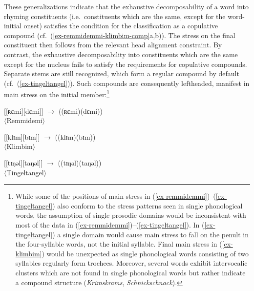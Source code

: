 \documentclass[output=paper
 ,nobabel
 ,draftmode
 ,colorlinks, citecolor=brown
]{langscibook}
\begin{document}
\noindent
These generalizations indicate that the exhaustive decomposability of a word into rhyming constituents (i.e.\ constituents which are the same, except for the word-initial onset) satisfies the condition for the classification as a copulative compound (cf.\ (\ref{ex-remmidemmi-klimbim-comp}a,b)).
The stress on the final constituent then follows from the relevant head alignment constraint. By contrast, the exhaustive decomposability into constituents which are the same except for the nucleus fails to satisfy the requirements for copulative compounds. Separate stems are still recognized, which form a regular compound by default (cf.\ (\ref{ex-tingeltangel})). Such compounds are consequently leftheaded, manifest in main stress on the initial member:\footnote{While some of the positions of main stress in (\ref{ex-remmidemmi})–(\ref{ex-tingeltangel}) also conform to the stress patterns seen in single phonological words, the assumption of single prosodic domains would be inconsistent with most of the data in (\ref{ex-remmidemmi})–(\ref{ex-tingeltangel}). In (\ref{ex-tingeltangel}) a single domain would cause main stress to fall on the penult in the four-syllable words, not the initial syllable. Final main stress in (\ref{ex-klimbim}) would be unexpected as single phonological words consisting of two syllables regularly form trochees. Moreover, several words exhibit intervocalic clusters which are not found in single phonological words but rather indicate a compound structure (\eg \emph{Krimskrams}, \emph{Schnickschnack}).}

\eal\label{ex-remmidemmi-klimbim-comp}
\ex\label{ex-remmidemmi-comp}
{}[[ʀɛmi][dɛmi]] $\rightarrow$
((ʀɛmi)(dɛmi))\\
$\langle$Remmidemi$\rangle$

\ex\label{ex-klimbim-comp}
{}[[klɪm][bɪm]] $\rightarrow$
((klɪm)(bɪm))\\
$\langle$Klimbim$\rangle$

\ex\label{ex-tingeltangel-comp}
{}[[tɪŋəl][taŋəl]] $\rightarrow$
((tɪŋəl)(taŋəl))\\
$\langle$Tingeltangel$\rangle$

\zl
\end{document}
